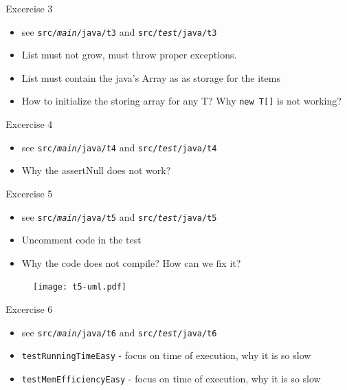 \documentclass{beamer}
\begin{document}
\begin{frame}{Excercise 3}

\begin{itemize}
    \item see \texttt{src/\textit{main}/java/t3} and \texttt{src/\textit{test}/java/t3}
    \item List must not grow, must throw proper exceptions.
    \item List must contain the java's Array as as storage for the items
    \item How to initialize the storing array for any T? Why \texttt{new T[]} is not working?
\end{itemize}
\end{frame}

\begin{frame}{Excercise 4}

\begin{itemize}
    \item see \texttt{src/\textit{main}/java/t4} and \texttt{src/\textit{test}/java/t4}
    \item Why the assertNull does not work?
\end{itemize}
\end{frame}

\begin{frame}{Excercise 5}

\begin{itemize}
    \item see \texttt{src/\textit{main}/java/t5} and \texttt{src/\textit{test}/java/t5}
    \item Uncomment code in the test
    \item Why the code does not compile? How can we fix it?
\end{itemize}
    \begin{figure}[htbp]
    \centering
        \texttt{[image: t5-uml.pdf]}
    \label{fig:t5-uml}
    \end{figure}
\end{frame}

\begin{frame}{Excercise 6}

\begin{itemize}
    \item see \texttt{src/\textit{main}/java/t6} and \texttt{src/\textit{test}/java/t6}
    \item \texttt{testRunningTimeEasy} - focus on time of execution, why it is so slow
    \item \texttt{testMemEfficiencyEasy} - focus on time of execution, why it is so slow
\end{itemize}
\end{frame}
\end{document}
